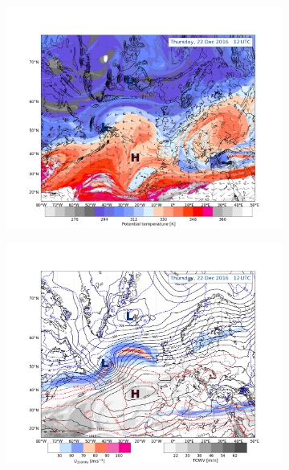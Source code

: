 \begin{figure}[ht!]%
	\centering
	\begin{subfigure}[b]{0.49\textwidth}
		\includegraphics[trim={4.2cm 0cm 4.3cm 5.1cm},clip,
		width=\textwidth]{./fig_DynTropo/20161222_12}
		\caption{} \label{fig:DT22}
	\end{subfigure}
	\begin{subfigure}[b]{0.49\textwidth}
		\includegraphics[trim={4.2cm 0cm 4.3cm 5.1cm},clip,
		width=\textwidth]{./fig_Geopot_Jet/20161222_12}
		\caption{} \label{fig:GP22}
	\end{subfigure}

\end{figure}

